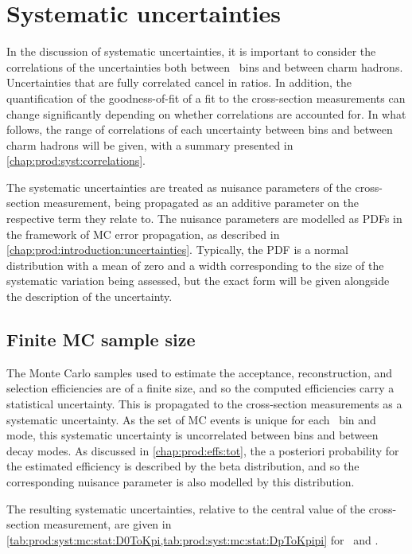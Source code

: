 \chapter{Systematic uncertainties}
\label{chap:prod:syst}

In the discussion of systematic uncertainties, it is important to consider the
correlations of the uncertainties both between \pTy\ bins and between charm
hadrons.
Uncertainties that are fully correlated cancel in ratios.
In addition, the quantification of the goodness-of-fit of a fit to the
cross-section measurements can change significantly depending on whether
correlations are accounted for.
In what follows, the range of correlations of each uncertainty between bins and
between charm hadrons will be given, with a summary presented in
\cref{chap:prod:syst:correlations}.

The systematic uncertainties are treated as nuisance parameters of the
cross-section measurement, being propagated as an additive parameter on the
respective term they relate to.
The nuisance parameters are modelled as \aclp{PDF} in the framework of \acl{MC}
error propagation, as described in \cref{chap:prod:introduction:uncertainties}.
Typically, the \ac{PDF} is a normal distribution with a mean of zero and a
width corresponding to the size of the systematic variation being assessed, but
the exact form will be given alongside the description of the uncertainty.

\section{Finite \acl{MC} sample size}
\label{chap:prod::syst:mcstat}

The Monte Carlo samples used to estimate the acceptance, reconstruction, and
selection efficiencies are of a finite size, and so the computed efficiencies
carry a statistical uncertainty.
This is propagated to the cross-section measurements as a systematic
uncertainty.
As the set of \ac{MC} events is unique for each \pTy\ bin and mode, this
systematic uncertainty is uncorrelated between bins and between decay modes.
As discussed in \cref{chap:prod:effs:tot}, the a posteriori probability for the
estimated efficiency is described by the beta distribution, and so the
corresponding nuisance parameter is also modelled by this distribution.

The resulting systematic uncertainties, relative to the central value of the
cross-section measurement, are given in
\cref{tab:prod:syst:mc:stat:D0ToKpi,tab:prod:syst:mc:stat:DpToKpipi} for
\DzToKpi\ and \DpToKpipi.

